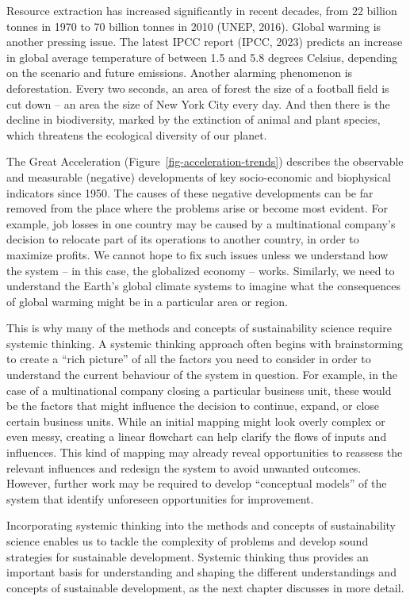 \documentclass[
  a4paper,
  openany]{book}
\begin{document}
Resource extraction has increased significantly in recent decades, from
22 billion tonnes in 1970 to 70 billion tonnes in 2010 (UNEP, 2016).
Global warming is another pressing issue. The latest IPCC report (IPCC,
2023) predicts an increase in global average temperature of between 1.5
and 5.8 degrees Celsius, depending on the scenario and future emissions.
Another alarming phenomenon is deforestation. Every two seconds, an area
of forest the size of a football field is cut down -- an area the size
of New York City every day. And then there is the decline in
biodiversity, marked by the extinction of animal and plant species,
which threatens the ecological diversity of our planet.

The Great Acceleration (Figure~\ref{fig-acceleration-trends}) describes
the observable and measurable (negative) developments of key
socio-economic and biophysical indicators since 1950. The causes of
these negative developments can be far removed from the place where the
problems arise or become most evident. For example, job losses in one
country may be caused by a multinational company's decision to relocate
part of its operations to another country, in order to maximize profits.
We cannot hope to fix such issues unless we understand how the system --
in this case, the globalized economy -- works. Similarly, we need to
understand the Earth's global climate systems to imagine what the
consequences of global warming might be in a particular area or region.

This is why many of the methods and concepts of sustainability science
require systemic thinking. A systemic thinking approach often begins
with brainstorming to create a ``rich picture'' of all the factors you
need to consider in order to understand the current behaviour of the
system in question. For example, in the case of a multinational company
closing a particular business unit, these would be the factors that
might influence the decision to continue, expand, or close certain
business units. While an initial mapping might look overly complex or
even messy, creating a linear flowchart can help clarify the flows of
inputs and influences. This kind of mapping may already reveal
opportunities to reassess the relevant influences and redesign the
system to avoid unwanted outcomes. However, further work may be required
to develop ``conceptual models'' of the system that identify unforeseen
opportunities for improvement.

Incorporating systemic thinking into the methods and concepts of
sustainability science enables us to tackle the complexity of problems
and develop sound strategies for sustainable development. Systemic
thinking thus provides an important basis for understanding and shaping
the different understandings and concepts of sustainable development, as
the next chapter discusses in more detail.
\end{document}
